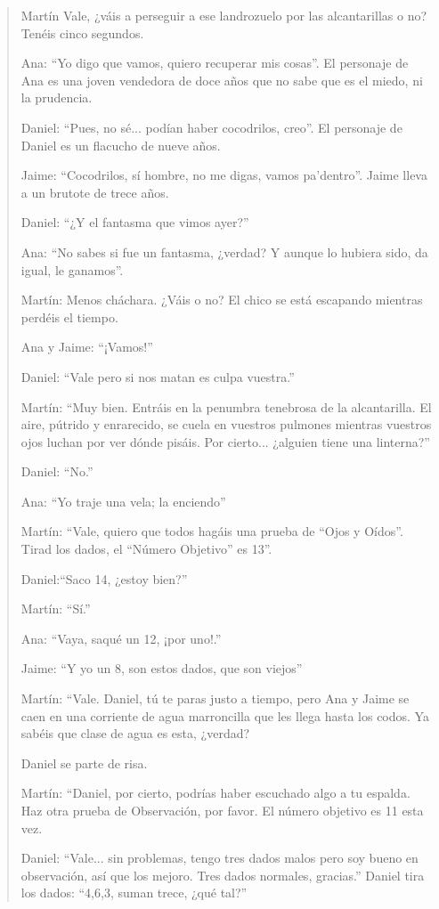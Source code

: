 \begin{quotation}

Martín Vale, ¿váis a perseguir a ese landrozuelo por las alcantarillas o no? Tenéis cinco segundos.

Ana: “Yo digo que vamos, quiero recuperar mis cosas”. El personaje de Ana es una joven vendedora de doce años que no sabe que es el miedo, ni la prudencia.

Daniel: “Pues, no sé... podían haber cocodrilos, creo”. El personaje de Daniel es un flacucho de nueve años.

Jaime: “Cocodrilos, sí hombre, no me digas, vamos pa'dentro”. Jaime lleva a un brutote de trece años.

Daniel: “¿Y el fantasma que vimos ayer?”

Ana: “No sabes si fue un fantasma, ¿verdad? Y aunque lo hubiera sido, da igual, le ganamos”.

Martín: Menos cháchara. ¿Váis o no? El chico se está escapando mientras perdéis el tiempo.

Ana y Jaime: “¡Vamos!”

Daniel: “Vale pero si nos matan es culpa vuestra.”

Martín: “Muy bien. Entráis en la penumbra tenebrosa de la alcantarilla. El aire, pútrido y enrarecido, se cuela en vuestros pulmones mientras vuestros ojos luchan por ver dónde pisáis. Por cierto... ¿alguien tiene una linterna?”

Daniel: “No.”

Ana: “Yo traje una vela; la enciendo”

Martín: “Vale, quiero que todos hagáis una prueba de “Ojos y Oídos”. Tirad los dados, el “Número Objetivo” es 13”.

Daniel:“Saco 14, ¿estoy bien?”

Martín: “Sí.”

Ana: “Vaya, saqué un 12, ¡por uno!.”

Jaime: “Y yo un 8, son estos dados, que son viejos”

Martín: “Vale. Daniel, tú te paras justo a tiempo, pero Ana y Jaime se caen en una corriente de agua marroncilla que les llega hasta los codos. Ya sabéis que clase de agua es esta, ¿verdad? 

Daniel se parte de risa.

Martín: “Daniel, por cierto, podrías haber escuchado algo a tu espalda. Haz otra prueba de Observación, por favor. El número objetivo es 11 esta vez. 

Daniel: “Vale... sin problemas, tengo tres dados malos pero soy bueno en observación, así que los mejoro. Tres dados normales, gracias.” Daniel tira los dados: “4,6,3, suman trece, ¿qué tal?”


\end{quotation}
